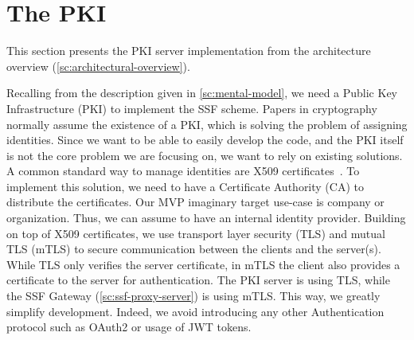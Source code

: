 \section{The PKI}\label{sc:PKI}

This section presents the PKI server implementation from the architecture overview (\cref{sc:architectural-overview}).

Recalling from the description given in \cref{sc:mental-model},
we need a Public Key Infrastructure (PKI) to implement the SSF scheme.
Papers in cryptography normally assume the existence of a PKI,
which is solving the problem of assigning identities.
Since we want to be able to easily develop the code, and the PKI itself
is not the core problem we are focusing on, we want to rely on existing
solutions.
A common standard way to manage identities are X509 certificates~\cite{rfc5280}.
To implement this solution, we need to have a Certificate Authority (CA)
to distribute the certificates.
Our MVP imaginary target use-case is company or organization. 
Thus, we can assume to have an internal identity provider.
Building on top of X509 certificates, we use transport
layer security (TLS) and mutual TLS (mTLS) to 
secure communication between the clients and the server(s).
While TLS only verifies the server certificate,
in mTLS the client also provides a certificate to the server
for authentication.
The PKI server is using TLS, while the SSF Gateway (\cref{sc:ssf-proxy-server}) is using mTLS.
This way, we greatly simplify development. Indeed, we 
avoid introducing any other Authentication
protocol such as OAuth2 or usage of JWT tokens.

